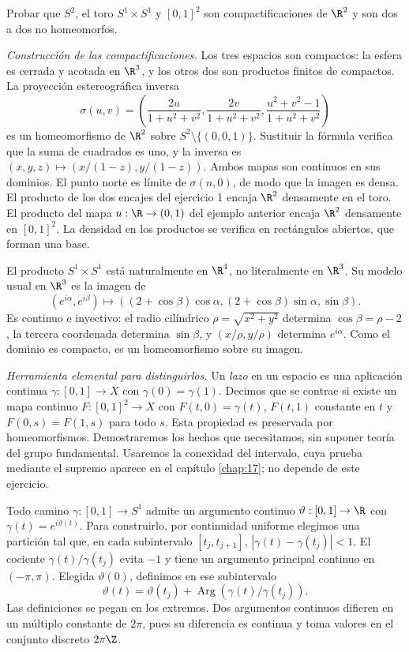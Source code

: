 \begin{ejercicio}
Probar que $S^2$, el toro $S^1\times S^1$ y $[0,1]^2$ son compactificaciones de $\R^2$ y son dos a dos no homeomorfos.
\end{ejercicio}
\begin{solucion}
\emph{Construcción de las compactificaciones.} Los tres espacios son compactos: la esfera es cerrada y acotada en $\R^3$, y los otros dos son productos finitos de compactos. La proyección estereográfica inversa
\[
\sigma(u,v)=\left(\frac{2u}{1+u^2+v^2},
\frac{2v}{1+u^2+v^2},\frac{u^2+v^2-1}{1+u^2+v^2}\right)
\]
es un homeomorfismo de $\R^2$ sobre $S^2\setminus\{(0,0,1)\}$. Sustituir la fórmula verifica que la suma de cuadrados es uno, y la inversa es $(x,y,z)\mapsto(x/(1-z),y/(1-z))$. Ambos mapas son continuos en sus dominios. El punto norte es límite de $\sigma(n,0)$, de modo que la imagen es densa. El producto de los dos encajes del ejercicio 1 encaja $\R^2$ densamente en el toro. El producto del mapa $u:\R\to(0,1)$ del ejemplo anterior encaja $\R^2$ densamente en $[0,1]^2$. La densidad en los productos se verifica en rectángulos abiertos, que forman una base.

El producto $S^1\times S^1$ está naturalmente en $\R^4$, no literalmente en $\R^3$. Su modelo usual en $\R^3$ es la imagen de
\[
(e^{i\alpha},e^{i\beta})\longmapsto
((2+\cos\beta)\cos\alpha,(2+\cos\beta)\sin\alpha,\sin\beta).
\]
Es continuo e inyectivo: el radio cilíndrico $\rho=\sqrt{x^2+y^2}$ determina $\cos\beta=\rho-2$, la tercera coordenada determina $\sin\beta$, y $(x/\rho,y/\rho)$ determina $e^{i\alpha}$. Como el dominio es compacto, es un homeomorfismo sobre su imagen.

\emph{Herramienta elemental para distinguirlos.} Un \emph{lazo} en un espacio es una aplicación continua $\gamma:[0,1]\to X$ con $\gamma(0)=\gamma(1)$. Decimos que se contrae si existe un mapa continuo $F:[0,1]^2\to X$ con $F(t,0)=\gamma(t)$, $F(t,1)$ constante en $t$ y $F(0,s)=F(1,s)$ para todo $s$. Esta propiedad es preservada por homeomorfismos. Demostraremos los hechos que necesitamos, sin suponer teoría del grupo fundamental. Usaremos la conexidad del intervalo, cuya prueba mediante el supremo aparece en el capítulo \ref{chap:17}; no depende de este ejercicio.

Todo camino $\gamma:[0,1]\to S^1$ admite un argumento continuo $\vartheta:[0,1]\to\R$ con $\gamma(t)=e^{i\vartheta(t)}$. Para construirlo, por continuidad uniforme elegimos una partición tal que, en cada subintervalo $[t_j,t_{j+1}]$, $|\gamma(t)-\gamma(t_j)|<1$. El cociente $\gamma(t)/\gamma(t_j)$ evita $-1$ y tiene un argumento principal continuo en $(-\pi,\pi)$. Elegida $\vartheta(0)$, definimos en ese subintervalo
\[
\vartheta(t)=\vartheta(t_j)+\operatorname{Arg}(\gamma(t)/\gamma(t_j)).
\]
Las definiciones se pegan en los extremos. Dos argumentos continuos difieren en un múltiplo constante de $2\pi$, pues su diferencia es continua y toma valores en el conjunto discreto $2\pi\Z$.


\end{solucion}
